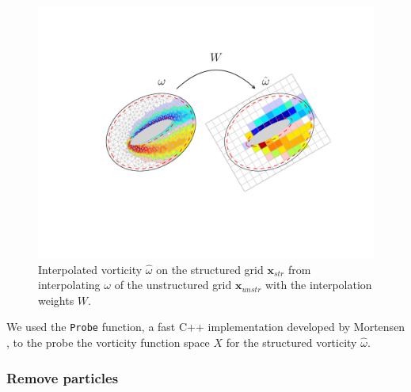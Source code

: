	\begin{figure}[h]
	\centering
	\includegraphics[trim=4.cm 4cm 2cm 2.5cm, clip, width=0.7\linewidth]{./figures/hybrid/interpolation/ellipse/interpolation_FE2StructuredGrid_withData.pdf}
	\caption{Interpolated vorticity $\hat{\omega}$ on the structured grid $\mathbf{x}_{str}$ from interpolating $\omega$ of the unstructured grid $\mathbf{x}_{unstr}$ with the interpolation weights $W$.}
	\label{fig:interpolation_FE2StructuredGrid_withData}
	\end{figure}

We used the \texttt{Probe} function, a fast C++ implementation developed by Mortensen \cite{fenicstools}, to the probe the vorticity function space $X$ for the structured vorticity $\hat{\omega}$.


\subsubsection*{Remove particles}

